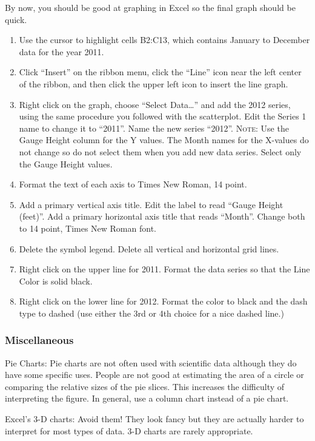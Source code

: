 \documentclass[12pt, hidelinks]{exam}
\begin{document}
By now, you should be good at graphing in Excel so the final graph should be quick.

\begin{enumerate}
	\item Use the cursor to highlight cells B2:C13, which contains January to December data for the year 2011.

	\item Click “Insert” on the ribbon menu, click the “Line” icon near the left center of the ribbon, and then click the upper left icon to insert the line graph.

	\item Right click on the graph, choose “Select Data\dots” and add the 2012 series, using the same procedure you followed with the scatterplot. Edit the Series 1 name to change it to “2011”. Name the new series “2012”. \textsc{Note}: Use the Gauge Height column for the Y values. The Month names for the X-values do not change so do not select them when you add new data series. Select only the Gauge Height values.

	\item Format the text of each axis to Times New Roman, 14 point.
	
	\item Add a primary vertical axis title. Edit the label to read “Gauge Height (feet)”. Add a primary horizontal axis title that reads “Month”. Change both to 14 point, Times New Roman font.

	\item Delete the symbol legend. Delete all vertical and horizontal grid lines.

	\item Right click on the upper line for 2011. Format the data series so that the Line Color is solid black.

	\item Right click on the lower line for 2012. Format the color to black and the dash type to dashed (use either the 3rd or 4th choice for a nice dashed line.)
\end{enumerate}

\subsubsection*{Miscellaneous}

Pie Charts: Pie charts are not often used with scientific data although they do have some specific uses. People are not good at estimating the area of a circle or comparing the relative sizes of the pie slices. This increases the difficulty of interpreting the figure. In general, use a column chart instead of a pie chart. 

Excel’s 3-D charts: Avoid them! They look fancy but they are actually harder to interpret for most types of data. 3-D charts are rarely appropriate. 
\end{document}
